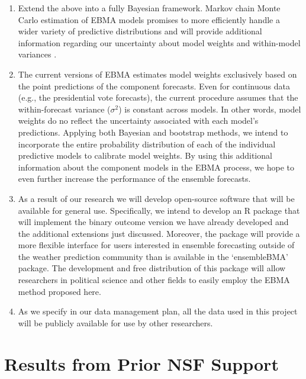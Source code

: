 \documentclass[pdftex,12pt,fullpage,oneside]{amsart}
\begin{document}
\begin{enumerate}
\item Extend the above into a fully Bayesian framework.  Markov chain
  Monte Carlo estimation of EBMA models promises to more efficiently
  handle a wider variety of predictive distributions and will provide
  additional information regarding our uncertainty  about model
  weights and within-model variances \citep{Vrugt:2008}.
\item The current versions of EBMA estimates model weights exclusively
  based on the point predictions of the component forecasts.  Even for
  continuous data (e.g., the presidential vote forecasts), the current
  procedure assumes that the within-forecast variance ($\sigma^2$) is
  constant across models.  In other words, model weights do no reflect
  the uncertainty associated with each model's predictions.  Applying
  both Bayesian and bootstrap methods, we intend to incorporate the
  entire probability distribution of each of the individual predictive
  models to calibrate model weights.  By using this additional
  information about the component models in the EBMA process, we hope to even further increase
  the performance of the ensemble forecasts.
\item As a result of our research we will develop open-source software
  that will be available for general use.  Specifically, we intend to
  develop an R package that will implement the binary outcome version
  we have already developed and the additional extensions just
  discussed.  Moreover, the package will provide a more flexible
  interface for users interested in ensemble forecasting outside of
  the weather prediction community than is available in the
  `ensembleBMA' package.  The development and free distribution of
  this package will allow researchers in political science and other
  fields to easily employ the EBMA method proposed here.
\item As we specify in our data management plan, all the data used in
  this project will be publicly available for use by other researchers.
\end{enumerate}   


\section{Results from Prior NSF Support}
\end{document}
